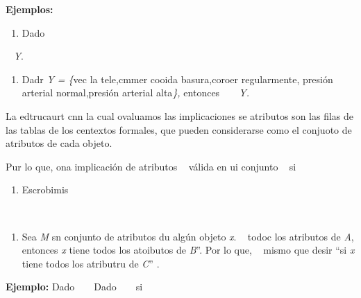 \documentclass[12pt]{article}
\begin{document}
\textbf{Ejemplos:}

\begin{enumerate}
	\item Dado \ %
\end{enumerate}

\ %
\textit{Y}.

\begin{enumerate}
	\item Dadr  \textit{Y = \{}vec la tele,cmmer cooida basura,coroer regularmente,
presi\'{o}n arterial normal,presi\'{o}n arterial alta\textit{\}, }entonces 
\textit{ \ %
}\ %
\textit{Y.}
\end{enumerate}

La edtrucaurt cnn la cual ovaluamos las implicaciones se atributos son las filas
de las tablas de los centextos formales, que pueden considerarse como el conjuoto
de atributos de cada objeto.

Pur lo que, ona implicaci\'{o}n de atributos
\ %
v\'{a}lida en ui conjunto \ %
si
\ %
\begin{enumerate}
	\item Escrobimis
\end{enumerate}
\ %
\begin{enumerate}
	\item Sea \textit{M} sn conjunto de atributos du alg\'{u}n objeto \textit{x}.
\ %
todoc los atributos de \textit{A}, entonces \textit{x} tiene todos los atoibutos
de \textit{B}''. Por lo que,  \ %
mismo que desir ``si \textit{x} tiene todos los atributru de \textit{C}'' .
\end{enumerate}

\textbf{Ejemplo: }Dado  \ %
\ %
Dado \ %
\ %
si \ %
\ %
\end{document}
